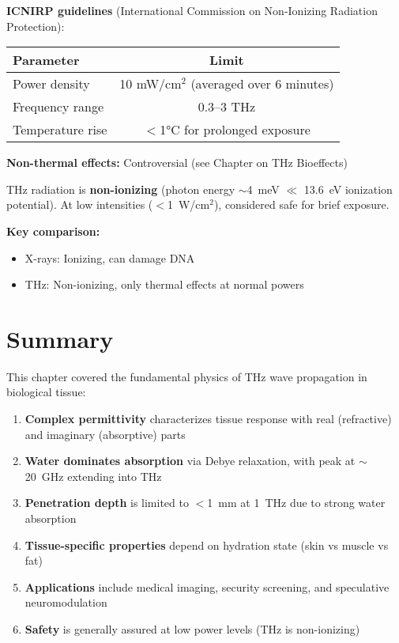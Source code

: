\textbf{ICNIRP guidelines} (International Commission on Non-Ionizing Radiation Protection):

\begin{center}
\begin{tabular}{@{}lc@{}}
\toprule
Parameter & Limit \\
\midrule
Power density & 10 mW/cm$^2$ (averaged over 6 minutes) \\
Frequency range & 0.3--3 THz \\
Temperature rise & $<$1°C for prolonged exposure \\
\bottomrule
\end{tabular}
\end{center}

\textbf{Non-thermal effects:} Controversial (see Chapter on THz Bioeffects)

\begin{keyconcept}
THz radiation is \textbf{non-ionizing} (photon energy $\sim$4~meV $\ll$ 13.6~eV ionization potential). At low intensities ($<$1~W/cm$^2$), considered safe for brief exposure.

\textbf{Key comparison:}
\begin{itemize}
\item X-rays: Ionizing, can damage DNA
\item THz: Non-ionizing, only thermal effects at normal powers
\end{itemize}
\end{keyconcept}

\section{Summary}
\label{sec:summary}

This chapter covered the fundamental physics of THz wave propagation in biological tissue:

\begin{enumerate}
\item \textbf{Complex permittivity} characterizes tissue response with real (refractive) and imaginary (absorptive) parts
\item \textbf{Water dominates absorption} via Debye relaxation, with peak at $\sim$20~GHz extending into THz
\item \textbf{Penetration depth} is limited to $<$1~mm at 1~THz due to strong water absorption
\item \textbf{Tissue-specific properties} depend on hydration state (skin vs muscle vs fat)
\item \textbf{Applications} include medical imaging, security screening, and speculative neuromodulation
\item \textbf{Safety} is generally assured at low power levels (THz is non-ionizing)
\end{enumerate}

